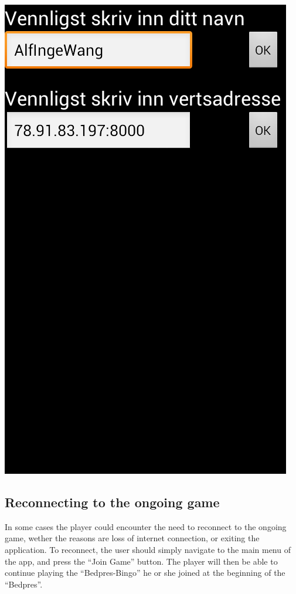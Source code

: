 \begin{center}
\includegraphics[scale=0.5]{Pikks/Settings1}
\end{center}

\subsection{Reconnecting to the ongoing game}
In some cases the player could encounter the need to reconnect to the
ongoing game, wether the reasons are loss of internet connection,
or exiting the application. To reconnect, the user should simply
navigate to the main menu of the app, and press the ``Join Game''
button. The player will then be able to continue playing the 
``Bedpres-Bingo'' he or she joined at the beginning of the ``Bedpres''.


